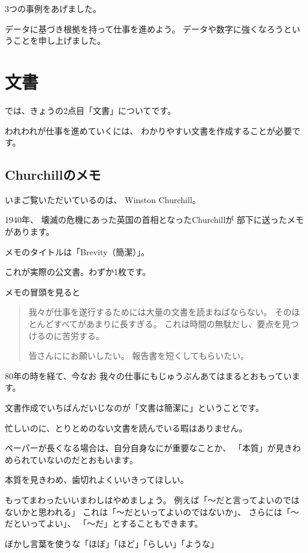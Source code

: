 \documentclass[uplatex,jis2004,dvipdfmx,12pt]{jsarticle}
\begin{document}
3つの事例をあげました。

データに基づき根拠を持って仕事を進めよう。
データや数字に強くなろうということを申し上げました。


\section{文書}

では、きょうの2点目「文書」についてです。

われわれが仕事を進めていくには、
わかりやすい文書を作成することが必要です。

\subsection{Churchillのメモ}

いまご覧いただいているのは、
Winston Churchill。

1940年、
壊滅の危機にあった英国の首相となったChurchillが
部下に送ったメモがあります。

メモのタイトルは「Brevity（簡潔）」。

これが実際の公文書。わずか1枚です。

メモの冒頭を見ると

\begin{quote}
我々が仕事を遂行するためには大量の文書を読まねばならない。
そのほとんどすべてがあまりに長すぎる。
これは時間の無駄だし、要点を見つけるのに苦労する。

皆さんににお願いしたい。
報告書を短くしてもらいたい。
\end{quote}



80年の時を経て、今なお
我々の仕事にもじゅうぶんあてはまるとおもっています。

文書作成でいちばんだいじなのが「文書は簡潔に」ということです。

忙しいのに、とりとめのない文書を読んでいる暇はありません。

ペーパーが長くなる場合は、自分自身なにが重要なことか、
「本質」が見きわめられていないのだとおもいます。

本質を見きわめ、歯切れよくいいきってほしい。

もってまわったいいまわしはやめましょう。
例えば「～だと言ってよいのではないかと思われる」
これは「～だといってよいのではないか」、
さらには「～だといってよい」、
「～だ」とすることもできます。

ぼかし言葉を使うな「ほぼ」「ほど」「らしい」「ような」
\end{document}
